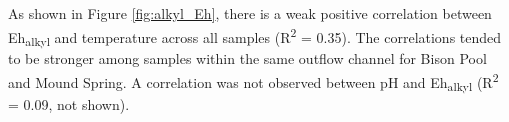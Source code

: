 





As shown in Figure \ref{fig:alkyl_Eh}, there is a weak positive correlation between Eh\textsubscript{alkyl} and temperature across all samples (R\textsuperscript{2} = 0.35). The correlations tended to be stronger among samples within the same outflow channel for Bison Pool and Mound Spring. A correlation was not observed between pH and Eh\textsubscript{alkyl} (R\textsuperscript{2} = 0.09, not shown).

